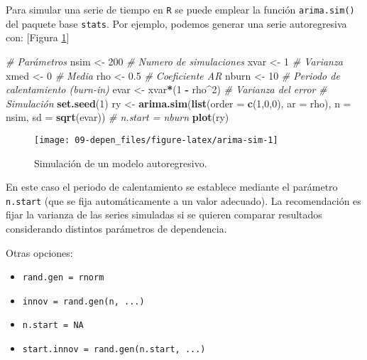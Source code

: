 \documentclass[
]{book}
\newenvironment{Shaded}{\begin{snugshade}}{\end{snugshade}}
\newcommand{\CommentTok}[1]{\textcolor[rgb]{0.56,0.35,0.01}{\textit{#1}}}
\newcommand{\DataTypeTok}[1]{\textcolor[rgb]{0.13,0.29,0.53}{#1}}
\newcommand{\DecValTok}[1]{\textcolor[rgb]{0.00,0.00,0.81}{#1}}
\newcommand{\FloatTok}[1]{\textcolor[rgb]{0.00,0.00,0.81}{#1}}
\newcommand{\KeywordTok}[1]{\textcolor[rgb]{0.13,0.29,0.53}{\textbf{#1}}}
\newcommand{\NormalTok}[1]{#1}
\newcommand{\OperatorTok}[1]{\textcolor[rgb]{0.81,0.36,0.00}{\textbf{#1}}}
\newcommand{\StringTok}[1]{\textcolor[rgb]{0.31,0.60,0.02}{#1}}
\theoremstyle{break}
\theoremstyle{definition}
\theoremstyle{definition}
\theoremstyle{definition}
\theoremstyle{remark}
\begin{document}
Para simular una serie de tiempo en \texttt{R}
se puede emplear la función \texttt{arima.sim()} del paquete base \texttt{stats}.
Por ejemplo, podemos generar una serie autoregresiva con:
{[}Figura \ref{fig:arima-sim}{]}

\begin{Shaded}
\begin{Highlighting}[]
\CommentTok{# Parámetros}
\NormalTok{nsim <-}\StringTok{ }\DecValTok{200}   \CommentTok{# Numero de simulaciones}
\NormalTok{xvar <-}\StringTok{ }\DecValTok{1}     \CommentTok{# Varianza}
\NormalTok{xmed <-}\StringTok{ }\DecValTok{0}     \CommentTok{# Media}
\NormalTok{rho <-}\StringTok{ }\FloatTok{0.5}    \CommentTok{# Coeficiente AR}
\NormalTok{nburn <-}\StringTok{ }\DecValTok{10}   \CommentTok{# Periodo de calentamiento (burn-in)}
\NormalTok{evar <-}\StringTok{ }\NormalTok{xvar}\OperatorTok{*}\NormalTok{(}\DecValTok{1} \OperatorTok{-}\StringTok{ }\NormalTok{rho}\OperatorTok{^}\DecValTok{2}\NormalTok{) }\CommentTok{# Varianza del error}
\CommentTok{# Simulación}
\KeywordTok{set.seed}\NormalTok{(}\DecValTok{1}\NormalTok{)}
\NormalTok{ry <-}\StringTok{ }\KeywordTok{arima.sim}\NormalTok{(}\KeywordTok{list}\NormalTok{(}\DataTypeTok{order =} \KeywordTok{c}\NormalTok{(}\DecValTok{1}\NormalTok{,}\DecValTok{0}\NormalTok{,}\DecValTok{0}\NormalTok{), }\DataTypeTok{ar =}\NormalTok{ rho), }
            \DataTypeTok{n =}\NormalTok{ nsim, }\DataTypeTok{sd =} \KeywordTok{sqrt}\NormalTok{(evar)) }\CommentTok{# n.start = nburn}
\KeywordTok{plot}\NormalTok{(ry)}
\end{Highlighting}
\end{Shaded}

\begin{figure}[!htb]

{\centering \texttt{[image: 09-depen\_files/figure-latex/arima-sim-1]} 

}

\caption{Simulación de un modelo autoregresivo.}\label{fig:arima-sim}
\end{figure}

En este caso el periodo de calentamiento se establece mediante el
parámetro \texttt{n.start} (que se fija automáticamente a un valor adecuado).
La recomendación es fijar la varianza de las series simuladas si se quieren
comparar resultados considerando distintos parámetros de dependencia.

Otras opciones:

\begin{itemize}
\item
  \texttt{rand.gen\ =\ rnorm}
\item
  \texttt{innov\ =\ rand.gen(n,\ ...)}
\item
  \texttt{n.start\ =\ NA}
\item
  \texttt{start.innov\ =\ rand.gen(n.start,\ ...)}
\end{itemize}
\end{document}
